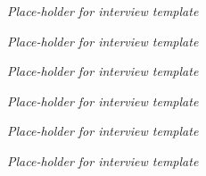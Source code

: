 \newpage
\Huge
\textit{Place-holder for interview template}
\normalsize

\newpage
\Huge
\textit{Place-holder for interview template}
\normalsize

\newpage
\Huge
\textit{Place-holder for interview template}
\normalsize

\newpage
\Huge
\textit{Place-holder for interview template}
\normalsize

\newpage
\Huge
\textit{Place-holder for interview template}
\normalsize

\newpage
\Huge
\textit{Place-holder for interview template}
\normalsize




